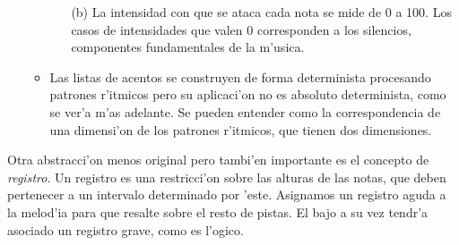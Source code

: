 ﻿\documentclass[a4paper,12pt]{article}
\begin{document}
\begin{enumerate}
\begin{itemize}
\begin{enumerate}
                        \item[(b)] La intensidad con que se ataca cada nota se mide de 0 a 100. Los casos de intensidades que valen 0 corresponden a los silencios, componentes fundamentales de la m'usica.
                        \end{enumerate}
                \item Las listas de acentos se construyen de forma determinista procesando patrones r'itmicos pero su aplicaci'on no es absoluto determinista, como se ver'a m'as adelante. Se pueden entender como la correspondencia de una dimensi'on de los patrones r'itmicos, que tienen dos dimensiones.
                \end{itemize}
        \end{enumerate}

Otra abstracci'on menos original pero tambi'en importante es el concepto de \emph{registro}. Un registro es una restricci'on sobre las alturas de las notas, que deben pertenecer a un intervalo determinado por 'este. Asignamos un registro aguda a la melod'ia para que resalte sobre el resto de pistas. El bajo a su vez tendr'a asociado un registro grave, como es l'ogico.
\end{document}
